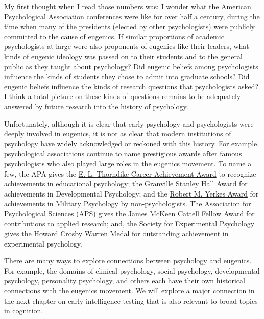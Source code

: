\documentclass[
  oneside,
  12pt]{crumpbook}
\begin{document}
My first thought when I read those numbers was: I wonder what the American Psychological Association conferences were like for over half a century, during the time when many of the presidents (elected by other psychologists) were publicly committed to the cause of eugenics. If similar proportions of academic psychologists at large were also proponents of eugenics like their leaders, what kinds of eugenic ideology was passed on to their students and to the general public as they taught about psychology? Did eugenic beliefs among psychologists influence the kinds of students they chose to admit into graduate schools? Did eugenic beliefs influence the kinds of research questions that psychologists asked? I think a total picture on these kinds of questions remains to be adequately answered by future research into the history of psychology.

Unfortunately, although it is clear that early psychology and psychologists were deeply involved in eugenics, it is not as clear that modern institutions of psychology have widely acknowledged or reckoned with this history. For example, psychological associations continue to name prestigious awards after famous psychologists who also played large roles in the eugenics movement. To name a few, the APA gives the \href{https://www.apa.org/about/awards/div-15-thorndike}{E. L. Thorndike Career Achievement Award} to recognize achievements in educational psychology; the \href{https://www.apadivisions.org/division-7/awards/hall}{Granville Stanley Hall Award} for achievements in Developmental Psychology; and the \href{https://www.apa.org/about/awards/div-19-yerkes}{Robert M. Yerkes Award} for achievements in Military Psychology by non-psychologists. The Association for Psychological Sciences (APS) gives the \href{https://www.psychologicalscience.org/members/awards-and-honors/cattell-award}{James McKeen Cattell Fellow Award} for contributions to applied research; and, the Society for Experimental Psychology gives the \href{https://www.sepsych.org/warren_medal.php}{Howard Crosby Warren Medal} for outstanding achievement in experimental psychology.

There are many ways to explore connections between psychology and eugenics. For example, the domains of clinical psychology, social psychology, developmental psychology, personality psychology, and others each have their own historical connections with the eugenics movement. We will explore a major connection in the next chapter on early intelligence testing that is also relevant to broad topics in cognition.
\end{document}
